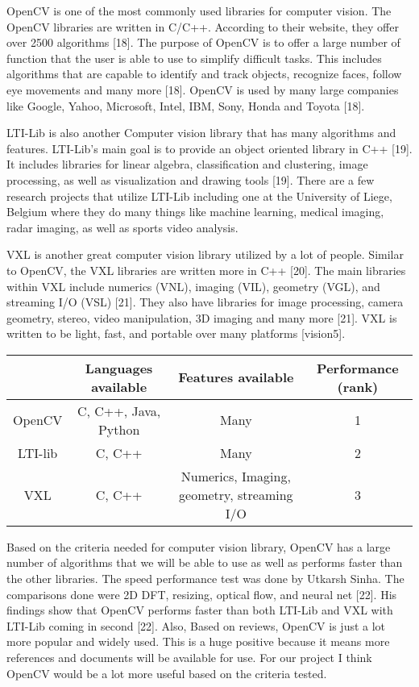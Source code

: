 \documentclass[letterpaper,10pt,onecolumn,draftclsnofoot]{IEEEtran}
\begin{document}
OpenCV is one of the most commonly used libraries for computer vision.
The OpenCV libraries are written in C/C++.
According to their website, they offer over 2500 algorithms [18].
The purpose of OpenCV is to offer a large number of function that the user is able to use to simplify difficult tasks.
This includes algorithms that are capable to identify and track objects, recognize faces, follow eye movements and many more [18].
OpenCV is used by many large companies like Google, Yahoo, Microsoft, Intel, IBM, Sony, Honda and Toyota [18]. 

LTI-Lib is also another Computer vision library that has many algorithms and features.
LTI-Lib's main goal is to provide an object oriented library in C++ [19].
It includes libraries for linear algebra, classification and clustering, image processing, as well as visualization and drawing tools [19].
There are a few research projects that utilize LTI-Lib including one at the University of Liege, Belgium where they do many things like machine learning, medical imaging, radar imaging, as well as sports video analysis.


VXL is another great computer vision library utilized by a lot of people.
Similar to OpenCV, the VXL libraries are written more in C++ [20].
The main libraries within VXL include numerics (VNL), imaging (VIL), geometry (VGL), and streaming I/O (VSL) [21].
They also have libraries for image processing, camera geometry, stereo, video manipulation, 3D imaging and many more [21].
VXL is written to be light, fast, and portable over many platforms [vision5].


\begin{center}
	\begin{tabular}{|c|c|c|c|}
		
		\hline
		\textbf{} & \textbf{Languages available} & \textbf{Features available} & \textbf{Performance (rank)} \\
		\hline
		OpenCV & C, C++, Java, Python & Many & 1 \\
		\hline
		LTI-lib & C, C++ & Many & 2 \\
		\hline
		VXL & C, C++ & Numerics, Imaging, geometry, streaming I/O & 3 \\
		\hline
		
	\end{tabular}
\end{center}

Based on the criteria needed for computer vision library, OpenCV has a large number of algorithms that we will be able to use as well as performs faster than the other libraries.
The speed performance test was done by Utkarsh Sinha.
The comparisons done were 2D DFT, resizing, optical flow, and neural net [22].
His findings show that OpenCV performs faster than both LTI-Lib and VXL with LTI-Lib coming in second [22].
Also, Based on reviews, OpenCV is just a lot more popular and widely used.
This is a huge positive because it means more references and documents will be available for use.
For our project I think OpenCV would be a lot more useful based on the criteria tested.
\end{document}
